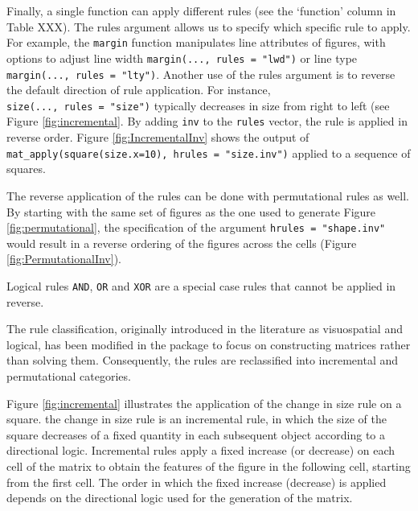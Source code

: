 Finally, a single function can apply different rules (see the `function' column in Table XXX).
The rules argument allows us to specify which specific rule to apply.
For example, the \texttt{margin} function manipulates line attributes of figures, with options to adjust line width \texttt{margin(...,\ rules\ =\ "lwd")} or line type \texttt{margin(...,\ rules\ =\ "lty")}.
Another use of the rules argument is to reverse the default direction of rule application.
For instance, \texttt{size(...,\ rules\ =\ "size")} typically decreases in size from right to left (see Figure \ref{fig:incremental}.
By adding \texttt{inv} to the \texttt{rules} vector, the rule is applied in reverse order.
Figure \ref{fig:IncrementalInv} shows the output of \texttt{mat\_apply(square(size.x=10),\ hrules\ =\ "size.inv")} applied to a sequence of squares.

%
%
%

The reverse application of the rules can be done with permutational rules as well.
By starting with the same set of figures as the one used to generate Figure \ref{fig:permutational}, the specification of the argument \texttt{hrules\ =\ "shape.inv"} would result in a reverse ordering of the figures across the cells (Figure \ref{fig:PermutationalInv}).

%
%
%

Logical rules \texttt{AND}, \texttt{OR} and \texttt{XOR} are a special case rules that cannot be applied in reverse.

The rule classification, originally introduced in the literature as visuospatial and logical, has been modified in the  package to focus on constructing matrices rather than solving them.
Consequently, the rules are reclassified into incremental and permutational categories.

Figure \ref{fig:incremental} illustrates the application of the change in size rule on a square.
the change in size rule is an incremental rule, in which the size of the square decreases of a fixed quantity in each subsequent object according to a directional logic.
Incremental rules apply a fixed increase (or decrease) on each cell of the matrix to obtain the features of the figure in the following cell, starting from the first cell.
The order in which the fixed increase (decrease) is applied depends on the directional logic used for the generation of the matrix.
%

